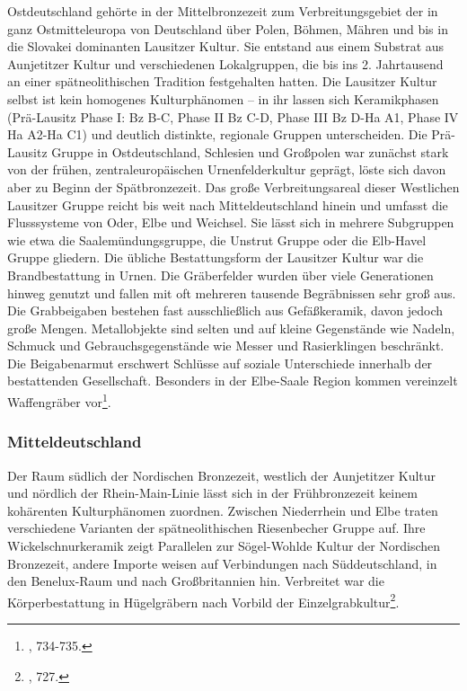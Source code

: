 \documentclass[openany,twoside,twocolumn]{book}
\let\rmarkdownfootnote\footnote%
\def\footnote{\protect\rmarkdownfootnote}
\begin{document}
Ostdeutschland gehörte in der Mittelbronzezeit zum Verbreitungsgebiet
der in ganz Ostmitteleuropa von Deutschland über Polen, Böhmen, Mähren
und bis in die Slovakei dominanten Lausitzer Kultur. Sie entstand aus
einem Substrat aus Aunjetitzer Kultur und verschiedenen Lokalgruppen,
die bis ins 2. Jahrtausend an einer spätneolithischen Tradition
festgehalten hatten. Die Lausitzer Kultur selbst ist kein homogenes
Kulturphänomen -- in ihr lassen sich Keramikphasen (Prä-Lausitz Phase I:
Bz B-C, Phase II Bz C-D, Phase III Bz D-Ha A1, Phase IV Ha A2-Ha C1) und
deutlich distinkte, regionale Gruppen unterscheiden. Die Prä-Lausitz
Gruppe in Ostdeutschland, Schlesien und Großpolen war zunächst stark von
der frühen, zentraleuropäischen Urnenfelderkultur geprägt, löste sich
davon aber zu Beginn der Spätbronzezeit. Das große Verbreitungsareal
dieser Westlichen Lausitzer Gruppe reicht bis weit nach
Mitteldeutschland hinein und umfasst die Flusssysteme von Oder, Elbe und
Weichsel. Sie lässt sich in mehrere Subgruppen wie etwa die
Saalemündungsgruppe, die Unstrut Gruppe oder die Elb-Havel Gruppe
gliedern. Die übliche Bestattungsform der Lausitzer Kultur war die
Brandbestattung in Urnen. Die Gräberfelder wurden über viele
Generationen hinweg genutzt und fallen mit oft mehreren tausende
Begräbnissen sehr groß aus. Die Grabbeigaben bestehen fast
ausschließlich aus Gefäßkeramik, davon jedoch große Mengen.
Metallobjekte sind selten und auf kleine Gegenstände wie Nadeln, Schmuck
und Gebrauchsgegenstände wie Messer und Rasierklingen beschränkt. Die
Beigabenarmut erschwert Schlüsse auf soziale Unterschiede innerhalb der
bestattenden Gesellschaft. Besonders in der Elbe-Saale Region kommen
vereinzelt Waffengräber vor\footnote{\textcite{jockenhovel_germany_2013},
  734-735.}.

\hypertarget{mitteldeutschland}{%
\subsubsection{Mitteldeutschland}\label{mitteldeutschland}}

Der Raum südlich der Nordischen Bronzezeit, westlich der Aunjetitzer
Kultur und nördlich der Rhein-Main-Linie lässt sich in der
Frühbronzezeit keinem kohärenten Kulturphänomen zuordnen. Zwischen
Niederrhein und Elbe traten verschiedene Varianten der spätneolithischen
Riesenbecher Gruppe auf. Ihre Wickelschnurkeramik zeigt Parallelen zur
Sögel-Wohlde Kultur der Nordischen Bronzezeit, andere Importe weisen auf
Verbindungen nach Süddeutschland, in den Benelux-Raum und nach
Großbritannien hin. Verbreitet war die Körperbestattung in Hügelgräbern
nach Vorbild der Einzelgrabkultur\footnote{\textcite{jockenhovel_germany_2013},
  727.}.
\end{document}
